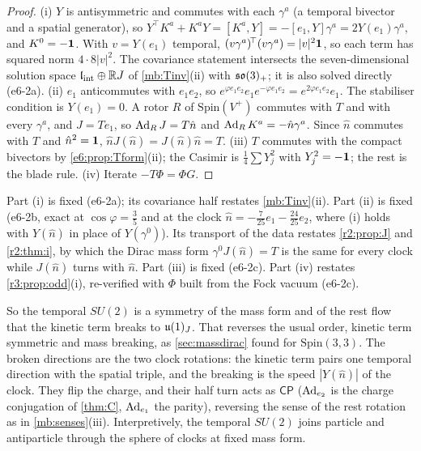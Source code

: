 \begin{proof}
(i) $Y$ is antisymmetric and commutes with each $\gamma^a$ (a temporal bivector and a spatial generator), so
$Y^{\!\top}K^a+K^aY=[K^a,Y]=-[e_1,Y]\gamma^a=2Y(e_1)\gamma^a$, and $K^0=-\mathbf 1$. With $v=Y(e_1)$ temporal, $(v\gamma^a)^{\!\top}(v\gamma^a)=|v|^2\mathbf 1$, so each term has
squared norm $4\cdot8|v|^2$. The covariance statement intersects the seven-dimensional solution space $\mathfrak l_{\rm int}\oplus\mathbb{R} J$ of \cref{mb:Tinv}(ii) with $\mathfrak{so}(3)_+$; it is also solved directly (e6-2a). (ii) $e_1$ anticommutes with $e_1e_2$, so $e^{\varphi e_1e_2}e_1e^{-\varphi e_1e_2}=e^{2\varphi e_1e_2}e_1$. The
stabiliser condition is $Y(e_1)=0$. A rotor $R$ of $\mathrm{Spin}(V^+)$ commutes with $T$ and with every $\gamma^a$, and $J=Te_1$, so $\operatorname{Ad}_RJ=T\hat n$ and
$\operatorname{Ad}_RK^a=-\hat n\gamma^a$. Since $\hat n$ commutes with $T$ and $\hat n^2=\mathbf 1$, $\hat nJ(\hat n)=J(\hat n)\hat n=T$. (iii) $T$ commutes with the compact bivectors by
\cref{e6:prop:Tform}(ii); the Casimir is $\tfrac14\sum Y_j^2$ with $Y_j^2=-\mathbf 1$; the rest is the blade rule. (iv) Iterate $-T\Phi=\Phi G$.
\end{proof}

Part (i) is fixed (e6-2a); its covariance half restates \cref{mb:Tinv}(ii). Part (ii) is fixed (e6-2b, exact at $\cos\varphi=\tfrac35$
and at the clock $\hat n=-\tfrac7{25}e_1-\tfrac{24}{25}e_2$, where (i) holds with $Y(\hat n)$ in place of $Y(\gamma^0)$). Its transport of the data restates
\cref{r2:prop:J} and \cref{r2:thm:i}, by which the Dirac mass form $\gamma^0J(\hat n)=T$ is the same for every clock while $J(\hat n)$ turns with $\hat n$.
Part (iii) is fixed (e6-2c). Part (iv) restates \cref{r3:prop:odd}(i), re-verified with $\Phi$ built from the Fock vacuum (e6-2c).

So the temporal $SU(2)$ is a symmetry of the mass form and of the rest flow that the kinetic term breaks to $\mathfrak{u}(1)_J$. That reverses the usual
order, kinetic term symmetric and mass breaking, as \cref{sec:massdirac} found for $\mathrm{Spin}(3,3)$. The broken directions are the two clock
rotations: the kinetic term pairs one temporal direction with the spatial triple, and the breaking is the speed $|Y(\hat n)|$ of the clock. They flip the
charge, and their half turn acts as $\mathsf{CP}$ ($\operatorname{Ad}_{e_2}$ is the charge conjugation of \cref{thm:C}, $\operatorname{Ad}_{e_1}$ the parity), reversing
the sense of the rest rotation as in \cref{mb:senses}(iii). Interpretively, the temporal $SU(2)$ joins particle and antiparticle through
the sphere of clocks at fixed mass form.

